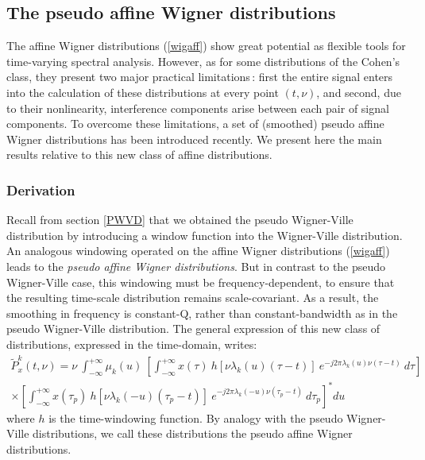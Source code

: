 \subsection{The pseudo affine Wigner distributions}
  The affine Wigner distributions (\ref{wigaff}) show great potential as flexible
tools for time-varying spectral analysis. However, as for some distributions of
the Cohen's class, they present two major practical limitations\,: first the
entire signal enters into the calculation of these distributions at every
point $(t,\nu)$, and second, due to their nonlinearity, interference
components arise between each pair of signal components. To overcome these
limitations, a set of (smoothed) pseudo affine Wigner distributions has
been introduced recently. We present here the main results relative to this
new class of affine distributions.

\subsubsection{Derivation}

  Recall from section \ref{PWVD} that we obtained the pseudo Wigner-Ville
distribution by introducing a window function into the Wigner-Ville
distribution. An analogous windowing operated on the affine Wigner
distributions (\ref{wigaff}) leads to the {\it pseudo affine Wigner
distributions}. But in contrast to the pseudo Wigner-Ville case, this
windowing must be frequency-dependent, to ensure that the resulting
time-scale distribution remains scale-covariant. As a result, the smoothing
in frequency is constant-Q, rather than constant-bandwidth as in the pseudo
Wigner-Ville distribution. The general expression of this new class of
distributions, expressed in the time-domain, writes:
\begin{eqnarray}
\tilde{P}_x^k(t,\nu)=\nu\ \int_{-\infty}^{+\infty} \mu_k(u)\
\left[\int_{-\infty}^{+\infty} x(\tau)\ h[\nu \lambda_k(u) (\tau-t)]\
e^{-j2\pi\lambda_k(u)\nu (\tau-t)}\ d\tau\right]\nonumber\\ 
\label{Pk}
\times\left[\int_{-\infty}^{+\infty} x(\tau_p)\ h[\nu
\lambda_k(-u) (\tau_p-t)]\ e^{-j2\pi\lambda_k(-u)\nu (\tau_p-t)}\
d\tau_p\right]^* du\ \    
\end{eqnarray}
where $h$ is the time-windowing function. By analogy with the pseudo
Wigner-Ville distributions, we call these distributions the pseudo affine
Wigner distributions.

